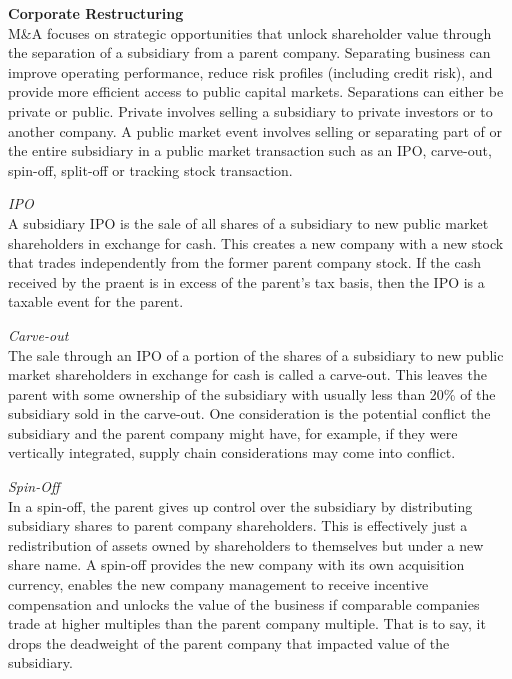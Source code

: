 \documentclass[10pt, a4paper]{article}
\begin{document}
\newpage
\noindent \textbf{Corporate Restructuring}\\
M\&A focuses on strategic opportunities that unlock shareholder value through the separation of a subsidiary from a parent company. Separating business can improve operating performance, reduce risk profiles (including credit risk), and provide more efficient access to public capital markets. Separations can either be private or public. Private involves selling a subsidiary to private investors or to another company. A public market event involves selling or separating part of or the entire subsidiary in a public market transaction such as an IPO, carve-out, spin-off, split-off or tracking stock transaction.

\vspace{10pt}
\noindent \textit{IPO}\\
A subsidiary IPO is the sale of all shares of a subsidiary to new public market shareholders in exchange for cash. This creates a new company with a new stock that trades independently from the former parent company stock. If the cash received by the praent is in excess of the parent's tax basis, then the IPO is a taxable event for the parent.

\vspace{10pt}
\noindent \textit{Carve-out}\\
The sale through an IPO of a portion of the shares of a subsidiary to new public market shareholders in exchange for cash is called a carve-out. This leaves the parent with some ownership of the subsidiary with usually less than 20\% of the subsidiary sold in the carve-out. One consideration is the potential conflict the subsidiary and the parent company might have, for example, if they were vertically integrated, supply chain considerations may come into conflict.

\vspace{10pt}
\noindent \textit{Spin-Off}\\
In a spin-off, the parent gives up control over the subsidiary by distributing subsidiary shares to parent company shareholders. This is effectively just a redistribution of assets owned by shareholders to themselves but under a new share name. A spin-off provides the new company with its own acquisition currency, enables the new company management to receive incentive compensation and unlocks the value of the business if comparable companies trade at higher multiples than the parent company multiple. That is to say, it drops the deadweight of the parent company that impacted value of the subsidiary.
\end{document}
